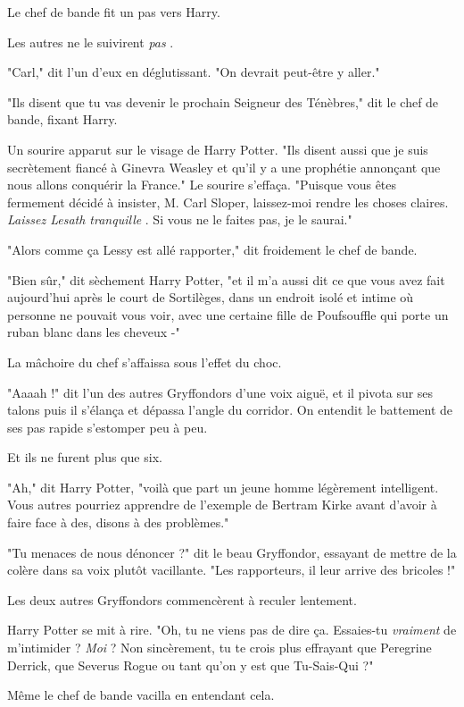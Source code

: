 Le chef de bande fit un pas vers Harry.

Les autres ne le suivirent \emph{pas} .

"Carl," dit l'un d'eux en déglutissant. "On devrait peut-être y aller."

"Ils disent que tu vas devenir le prochain Seigneur des Ténèbres," dit le chef de bande, fixant Harry.

Un sourire apparut sur le visage de Harry Potter. "Ils disent aussi que je suis secrètement fiancé à Ginevra Weasley et qu'il y a une prophétie annonçant que nous allons conquérir la France." Le sourire s'effaça. "Puisque vous êtes fermement décidé à insister, M. Carl Sloper, laissez-moi rendre les choses claires. \emph{Laissez Lesath tranquille} . Si vous ne le faites pas, je le saurai."

"Alors comme ça Lessy est allé rapporter," dit froidement le chef de bande.

"Bien sûr," dit sèchement Harry Potter, "et il m'a aussi dit ce que vous avez fait aujourd'hui après le court de Sortilèges, dans un endroit isolé et intime où personne ne pouvait vous voir, avec une certaine fille de Poufsouffle qui porte un ruban blanc dans les cheveux -"

La mâchoire du chef s'affaissa sous l'effet du choc.

"Aaaah !" dit l'un des autres Gryffondors d'une voix aiguë, et il pivota sur ses talons puis il s'élança et dépassa l'angle du corridor. On entendit le battement de ses pas rapide s'estomper peu à peu.

Et ils ne furent plus que six.

"Ah," dit Harry Potter, "voilà que part un jeune homme légèrement intelligent. Vous autres pourriez apprendre de l'exemple de Bertram Kirke avant d'avoir à faire face à des, disons à des problèmes."

"Tu menaces de nous dénoncer ?" dit le beau Gryffondor, essayant de mettre de la colère dans sa voix plutôt vacillante. "Les rapporteurs, il leur arrive des bricoles !"

Les deux autres Gryffondors commencèrent à reculer lentement.

Harry Potter se mit à rire. "Oh, tu ne viens pas de dire ça. Essaies-tu \emph{vraiment}  de m'intimider ? \emph{Moi } ? Non sincèrement, tu te crois plus effrayant que Peregrine Derrick, que Severus Rogue ou tant qu'on y est que Tu-Sais-Qui ?"

Même le chef de bande vacilla en entendant cela.


